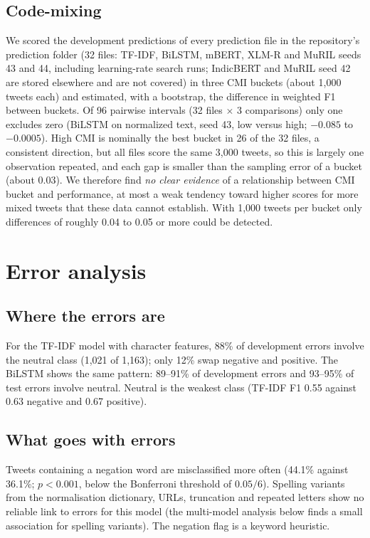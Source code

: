 \subsection{Code-mixing}
We scored the development predictions of every prediction file in the repository's prediction folder (32 files: TF-IDF, BiLSTM,
mBERT, XLM-R and MuRIL seeds 43 and 44, including learning-rate search runs; IndicBERT and MuRIL seed 42 are stored elsewhere
and are not covered) in three CMI buckets (about 1{,}000 tweets each) and estimated, with a bootstrap, the difference in weighted
F1 between buckets. Of 96 pairwise intervals (32 files $\times$ 3 comparisons) only one excludes zero (BiLSTM on normalized text,
seed 43, low versus high; $-0.085$ to $-0.0005$). High CMI is nominally the best bucket in 26 of the 32 files, a consistent
direction, but all files score the same 3{,}000 tweets, so this is largely one observation repeated, and each gap is smaller than
the sampling error of a bucket (about 0.03). We therefore find \emph{no clear evidence} of a relationship between CMI bucket and
performance, at most a weak tendency toward higher scores for more mixed tweets that these data cannot establish. With 1{,}000
tweets per bucket only differences of roughly 0.04 to 0.05 or more could be detected.

\section{Error analysis}
\subsection{Where the errors are}
For the TF-IDF model with character features, 88\% of development errors involve the neutral class (1{,}021 of 1{,}163);
only 12\% swap negative and positive. The BiLSTM shows the same pattern: 89--91\% of development errors and 93--95\% of
test errors involve neutral. Neutral is the weakest class (TF-IDF F1 0.55 against 0.63 negative and 0.67 positive).

\subsection{What goes with errors}
Tweets containing a negation word are misclassified more often (44.1\% against 36.1\%; $p<0.001$, below the Bonferroni
threshold of $0.05/6$). Spelling variants from the normalisation dictionary, URLs, truncation and repeated letters show no
reliable link to errors for this model (the multi-model analysis below finds a small association for spelling variants). The
negation flag is a keyword heuristic.

